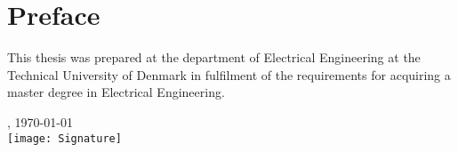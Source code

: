 \chapter{Preface}
This thesis was prepared at the department of Electrical Engineering at the Technical University of Denmark in fulfilment of the requirements for acquiring a master degree in Electrical Engineering.


\vfill

{
\centering
    \thesislocation{}, \today\\[1cm]
    \hspace{3cm}\texttt{[image: Signature]}\\[1cm]
\begin{flushright}
    \thesisauthor{}
\end{flushright}
}